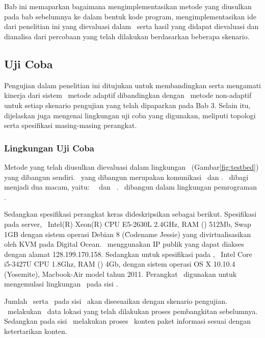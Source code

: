\chapter{\babEmpat}

Bab ini memaparkan bagaimana mengimplementasikan metode yang diusulkan pada bab
sebelumnya ke dalam bentuk kode program, mengimplementasikan ide dari penelitian
ini yang dievaluasi dalam \testbed~serta hasil yang didapat dievaluasi dan
dianalisa dari percobaan yang telah dilakukan berdasarkan beberapa skenario.

\section{Uji Coba}
Pengujian dalam penelitian ini ditujukan untuk membandingkan serta mengamati
kinerja dari sistem \tracking~metode adaptif dibandingkan dengan
\tracking~metode non-adaptif untuk setiap skenario pengujian yang telah
dipaparkan pada Bab 3. Selain itu, dijelaskan juga mengenai lingkungan uji coba
yang digunakan, meliputi topologi serta spesifikasi masing-masing perangkat.

\subsection{Lingkungan Uji Coba}

Metode yang telah diusulkan dievaluasi dalam lingkungan
\testbed~(Gambar\ref{fig:testbed}) yang dibangun
sendiri. \Testbed~yang dibangun merupakan komunikasi \server~dan \client.
\Client~dibagi menjadi dua macam, yaitu: \publisher~\client~dan
\subscriber~\client. \Testbed~dibangun dalam lingkungan pemrograman \nodejs.

Sedangkan spesifikasi perangkat keras dideskripsikan sebagai berikut.
Spesifikasi pada server, \processor~Intel(R) Xeon(R) CPU E5-2630L 2.4GHz, RAM
(\ram) 512Mb, Swap 1GB dengan sistem operasi Debian 8 (\f{Codename} Jessie) yang
divirtualisasikan oleh KVM pada Digital Ocean. \Server~menggunakan IP publik
yang dapat diakses dengan alamat 128.199.170.158. Sedangkan untuk spesifikasi
pada \client, \processor~Intel Core i5-3427U CPU 1.8Ghz, RAM (\ram) 4Gb, dengan
sistem operasi OS X 10.10.4 (Yosemite), Macbook-Air model tahun 2011. Perangkat
\client~digunakan untuk mengemulasi lingkungan \testbed~pada sisi \client.

Jumlah \publisher~serta \subscriber~pada sisi \client~akan disesuaikan dengan
skenario pengujian. \Publisher~melakukan \publish~data lokasi yang telah
dilakukan proses pembangkitan sebelumnya. Sedangkan pada sisi
\subscriber~melakukan proses \logging~konten paket informasi sesuai dengan
ketertarikan konten.

